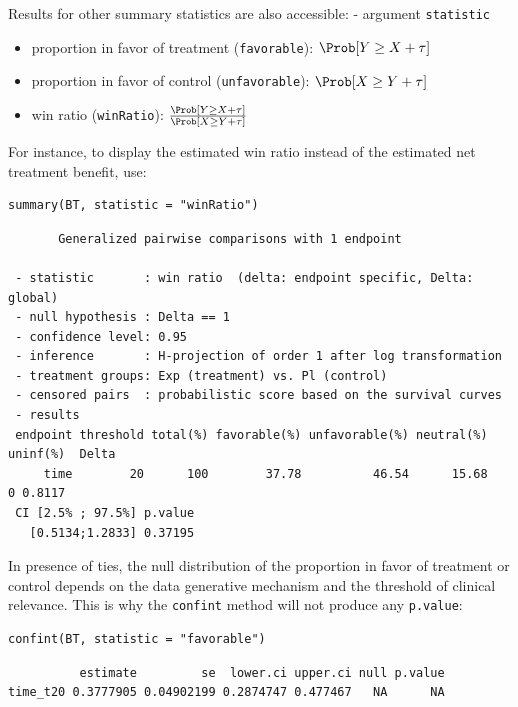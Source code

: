 \documentclass[12pt]{article}
\newcommand\Warning[1][3ex]{%
\renewcommand\stacktype{L}%
\scaleto{\stackon[1.3pt]{\color{red}$\triangle$}{\tiny\bfseries !}}{#1}%
\xspace
}
\begin{document}
Results for other summary statistics are also accessible: \hfill -
argument \texttt{statistic}
\begin{itemize}
\item proportion in favor of treatment (\texttt{favorable}): \(\Prob[Y\geq X + \tau]\)
\item proportion in favor of control (\texttt{unfavorable}): \(\Prob[X\geq Y + \tau]\)
\item win ratio (\texttt{winRatio}): \(\frac{\Prob[Y\geq X + \tau]}{\Prob[X\geq Y + \tau]}\)
\end{itemize}

\noindent For instance, to display the estimated win ratio instead of
the estimated net treatment benefit, use:
\lstset{language=r,label= ,caption= ,captionpos=b,numbers=none}
\begin{lstlisting}
summary(BT, statistic = "winRatio")
\end{lstlisting}

\begin{verbatim}
       Generalized pairwise comparisons with 1 endpoint

 - statistic       : win ratio  (delta: endpoint specific, Delta: global) 
 - null hypothesis : Delta == 1 
 - confidence level: 0.95 
 - inference       : H-projection of order 1 after log transformation 
 - treatment groups: Exp (treatment) vs. Pl (control) 
 - censored pairs  : probabilistic score based on the survival curves
 - results
 endpoint threshold total(%) favorable(%) unfavorable(%) neutral(%) uninf(%)  Delta
     time        20      100        37.78          46.54      15.68        0 0.8117
 CI [2.5% ; 97.5%] p.value 
   [0.5134;1.2833] 0.37195
\end{verbatim}

\Warning In presence of ties, the null distribution of the proportion
in favor of treatment or control depends on the data generative
mechanism and the threshold of clinical relevance. This is why the
\texttt{confint} method will not produce any \texttt{p.value}:
\lstset{language=r,label= ,caption= ,captionpos=b,numbers=none}
\begin{lstlisting}
confint(BT, statistic = "favorable")
\end{lstlisting}

\begin{verbatim}
          estimate         se  lower.ci upper.ci null p.value
time_t20 0.3777905 0.04902199 0.2874747 0.477467   NA      NA
\end{verbatim}
\end{document}
